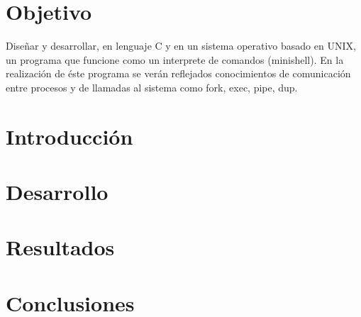 \documentclass[12pt, fleqn]{article}                             %
\theoremstyle{break}                                            %
\begin{document}
\restoregeometry                                                    %
\nopagecolor                                                        %




\tableofcontents{}
\label{sec:Index}

\clearpage
\section{Objetivo}
    Diseñar y desarrollar, en lenguaje C y en un sistema operativo basado en UNIX, un programa que funcione como un interprete de comandos (minishell). En la realización de éste programa se verán reflejados conocimientos de comunicación entre procesos y de llamadas al sistema como fork, exec, pipe, dup.
\section{Introducción}
    
\section{Desarrollo}

\section{Resultados}

\section{Conclusiones}



   
    \begin{appendices}
    
    
    
    \end{appendices}
    
    
    
\end{document}
